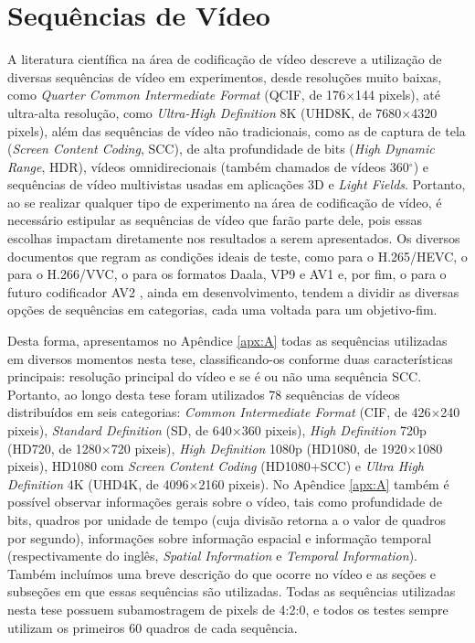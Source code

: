 \section{Sequências de Vídeo}
\label{cap:4.1}

A literatura científica na área de codificação de vídeo descreve a utilização de diversas sequências de vídeo em experimentos, desde resoluções muito baixas, como \textit{Quarter Common Intermediate Format} (QCIF, de 176$\times$144 pixels), até ultra-alta resolução, como \textit{Ultra-High Definition} 8K (UHD8K, de 7680$\times$4320 pixels), além das sequências de vídeo não tradicionais, como as de captura de tela (\textit{Screen Content Coding}, SCC), de alta profundidade de bits (\textit{High Dynamic Range}, HDR), vídeos omnidirecionais (também chamados de vídeos 360$^{\circ}$) e sequências de vídeo multivistas usadas em aplicações 3D e \textit{Light Fields}. Portanto, ao se realizar qualquer tipo de experimento na área de codificação de vídeo, é necessário estipular as sequências de vídeo que farão parte dele, pois essas escolhas impactam diretamente nos resultados a serem apresentados. Os diversos documentos que regram as condições ideais de teste, como \citet{bib:hevcctc} para o H.265/HEVC, o \citet{bib:vvcctc} para o H.266/VVC, o \citet{bib:ietfnetvct} para os formatos Daala, VP9 e AV1 e, por fim, o \citet{bib:av2ctc} para o futuro codificador AV2 \cite{bib:av2_avm}, ainda em desenvolvimento, tendem a dividir as diversas opções de sequências em categorias, cada uma voltada para um objetivo-fim.

Desta forma, apresentamos no Apêndice \ref{apx:A} todas as sequências utilizadas em diversos momentos nesta tese, classificando-os conforme duas características principais: resolução principal do vídeo e se é ou não uma sequência SCC. Portanto, ao longo desta tese foram utilizados 78 sequências de vídeos distribuídos em seis categorias: \textit{Common Intermediate Format} (CIF, de 426$\times$240 pixeis), \textit{Standard Definition} (SD, de 640$\times$360 pixeis), \textit{High Definition} 720p (HD720, de 1280$\times$720 pixeis), \textit{High Definition} 1080p (HD1080, de 1920$\times$1080 pixeis), HD1080 com \textit{Screen Content Coding} (HD1080+SCC) e \textit{Ultra High Definition} 4K (UHD4K, de 4096$\times$2160 pixeis). No Apêndice \ref{apx:A} também é possível observar informações gerais sobre o vídeo, tais como profundidade de bits, quadros por unidade de tempo (cuja divisão retorna a o valor de quadros por segundo), informações sobre informação espacial e informação temporal (respectivamente do inglês, \textit{Spatial Information} e \textit{Temporal Information}). Também incluímos uma breve descrição do que ocorre no vídeo e as seções e subseções em que essas sequências são utilizadas. Todas as sequências utilizadas nesta tese possuem subamostragem de pixels de 4:2:0, e todos os testes sempre utilizam os primeiros 60 quadros de cada sequência.
